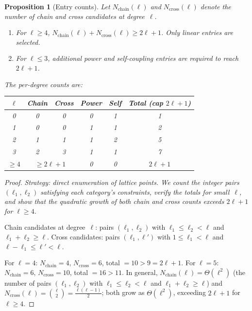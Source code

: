 \documentclass{article}
\theoremstyle{plain}
\newtheorem{proposition}[theorem]{Proposition}
\theoremstyle{definition}
\theoremstyle{remark}
\begin{document}
\begin{proposition}[Entry counts]\label{prop:entry-counts}
Let $N_{\mathrm{chain}}(\ell)$ and $N_{\mathrm{cross}}(\ell)$ denote
the number of chain and cross candidates at degree~$\ell$.
\begin{enumerate}[label=(\roman*),nosep]
  \item For $\ell \ge 4$,
    $N_{\mathrm{chain}}(\ell) + N_{\mathrm{cross}}(\ell) \ge 2\ell + 1$.
    Only linear entries are selected.
  \item For $\ell \le 3$, additional power and self-coupling entries are
    required to reach $2\ell+1$.
\end{enumerate}
The per-degree counts are:
\begin{center}
\small
\begin{tabular}{cccccc}
  \toprule
  $\ell$ & Chain & Cross & Power & Self & Total (cap $2\ell+1$)\\
  \midrule
  0 & 0 & 0 & 0 & 1 & 1 \\
  1 & 0 & 0 & 1 & 1 & 2 \\
  2 & 1 & 1 & 1 & 2 & 5 \\
  3 & 2 & 3 & 1 & 1 & 7 \\
  $\ge 4$ & \multicolumn{2}{c}{$\ge 2\ell+1$} & 0 & 0 & $2\ell+1$ \\
  \bottomrule
\end{tabular}
\end{center}
\end{proposition}
\begin{proof}
\emph{Strategy: direct enumeration of lattice points.
We count the integer pairs $(\ell_1, \ell_2)$ satisfying each
category's constraints, verify the totals for small~$\ell$, and show
that the quadratic growth of both chain and cross counts exceeds
$2\ell+1$ for $\ell \ge 4$.}

Chain candidates at degree~$\ell$: pairs
$(\ell_1, \ell_2)$ with $\ell_1 \le \ell_2 < \ell$ and
$\ell_1 + \ell_2 \ge \ell$. Cross candidates: pairs
$(\ell_1, \ell')$ with $1 \le \ell_1 < \ell$ and
$\ell - \ell_1 \le \ell' < \ell$.

For $\ell = 4$: $N_{\mathrm{chain}} = 4$,
$N_{\mathrm{cross}} = 6$, total $= 10 > 9 = 2\ell+1$.
For $\ell = 5$: $N_{\mathrm{chain}} = 6$,
$N_{\mathrm{cross}} = 10$, total $= 16 > 11$.
In general, $N_{\mathrm{chain}}(\ell) = \Theta(\ell^2)$ (the number
of pairs $(\ell_1,\ell_2)$ with $\ell_1 \le \ell_2 < \ell$ and
$\ell_1 + \ell_2 \ge \ell$)
and $N_{\mathrm{cross}}(\ell) = \binom{\ell}{2} =
\frac{\ell(\ell-1)}{2}$; both grow as $\Theta(\ell^2)$,
exceeding $2\ell+1$ for $\ell \ge 4$.
\end{proof}
\end{document}
